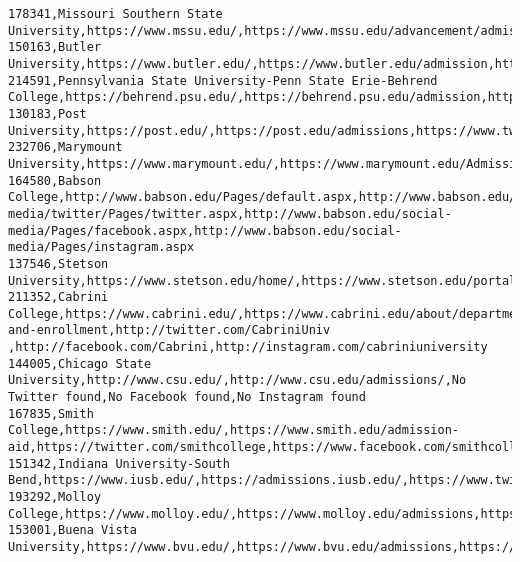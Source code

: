 \documentclass[11pt]{article}
\begin{document}
\begin{Verbatim}[commandchars=\\\{\}]
178341,Missouri Southern State University,https://www.mssu.edu/,https://www.mssu.edu/advancement/admissions/,https://twitter.com/mosolions,https://www.facebook.com/mssulions/,https://www.instagram.com/mosolions/
150163,Butler University,https://www.butler.edu/,https://www.butler.edu/admission,https://twitter.com/butleru,https://www.facebook.com/butleruniversity,https://www.instagram.com/p/BpZtdsLhH5D/
214591,Pennsylvania State University-Penn State Erie-Behrend College,https://behrend.psu.edu/,https://behrend.psu.edu/admission,https://twitter.com/psbehrend,https://www.facebook.com/pennstatebehrend,http://instagram.com/psbehrend
130183,Post University,https://post.edu/,https://post.edu/admissions,https://www.twitter.com/Postuniversity,https://www.facebook.com/Postuniversity,https://www.instagram.com/postuniversity
232706,Marymount University,https://www.marymount.edu/,https://www.marymount.edu/Admissions/Welcome,https://twitter.com/marymountu,https://www.facebook.com/marymount.university,http://instagram.com/marymountu
164580,Babson College,http://www.babson.edu/Pages/default.aspx,http://www.babson.edu/admission/Pages/default.aspx,http://www.babson.edu/social-media/twitter/Pages/twitter.aspx,http://www.babson.edu/social-media/Pages/facebook.aspx,http://www.babson.edu/social-media/Pages/instagram.aspx
137546,Stetson University,https://www.stetson.edu/home/,https://www.stetson.edu/portal/admissions/,https://twitter.com/stetsonu,https://www.facebook.com/stetsonU,https://instagram.com/stetsonu
211352,Cabrini College,https://www.cabrini.edu/,https://www.cabrini.edu/about/departments/admissions-and-enrollment,http://twitter.com/CabriniUniv ,http://facebook.com/Cabrini,http://instagram.com/cabriniuniversity
144005,Chicago State University,http://www.csu.edu/,http://www.csu.edu/admissions/,No Twitter found,No Facebook found,No Instagram found
167835,Smith College,https://www.smith.edu/,https://www.smith.edu/admission-aid,https://twitter.com/smithcollege,https://www.facebook.com/smithcollege,https://www.instagram.com/smithcollege/
151342,Indiana University-South Bend,https://www.iusb.edu/,https://admissions.iusb.edu/,https://www.twitter.com/IUSouthBend,https://www.facebook.com/IUSouthBend,https://www.instagram.com/explore/tags/iusb2018/
193292,Molloy College,https://www.molloy.edu/,https://www.molloy.edu/admissions,https://twitter.com/MolloyCollege,http://www.facebook.com/GoMolloy,https://www.instagram.com/molloycollege/
153001,Buena Vista University,https://www.bvu.edu/,https://www.bvu.edu/admissions,https://twitter.com/buenavistauniv,https://www.facebook.com/buenavistauniversity,https://www.instagram.com/buenavistauniversity

\end{Verbatim}
\end{document}
